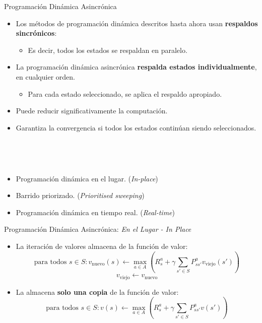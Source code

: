 \documentclass[10pt, envcountsect, handout, aspectratio=1610, hyperref={hypertexnames=true}]{beamer}
\begin{document}
\begin{frame}{Programación Dinámica Asincrónica}

\noindent {}
	\begin{itemize}
		\item Los métodos de programación dinámica descritos hasta ahora usan \textbf{respaldos sincrónicos}:
		\begin{itemize}
			\item Es decir, todos los estados se respaldan en paralelo.
		\end{itemize}
		\item La programación dinámica asincrónica \textbf{respalda estados individualmente}, en cualquier orden.
		\begin{itemize}
			\item Para cada estado seleccionado, se aplica el respaldo apropiado.
		\end{itemize}
		\item Puede reducir significativamente la computación.
		\item Garantiza la convergencia si todos los estados continúan siendo seleccionados.
	\end{itemize}

~

~

\noindent {}
\begin{itemize}
	\item {Programación dinámica en el lugar.}  (\textit{In-place})
	\item {Barrido priorizado.} (\textit{Prioritised sweeping})
	\item {Programación dinámica en tiempo real.} (\textit{Real-time})
\end{itemize}
\end{frame}

\begin{frame}{Programación Dinámica Asincrónica: \textit{En el Lugar - In Place}}

	\begin{itemize}  \large
		\item La iteración de valores almacena  de la función de valor:
		\[
		\text{para todos } s \in S: v_{\text{nuevo}}(s) \leftarrow \max_{a \in A} \left(R^a_s + \gamma \sum_{s' \in S} P^a_{ss'} v_{\text{viejo}}(s')\right)
		\]
		\[
		v_{\text{viejo}} \leftarrow v_{\text{nuevo}}
		\]
		\item La  almacena \textbf{solo una copia} de la función de valor:
		\[
		\text{para todos } s \in S: v(s) \leftarrow \max_{a \in A} \left(R^a_s + \gamma \sum_{s' \in S} P^a_{ss'} v(s')\right)
		\]
	\end{itemize}
\end{frame}
\end{document}
